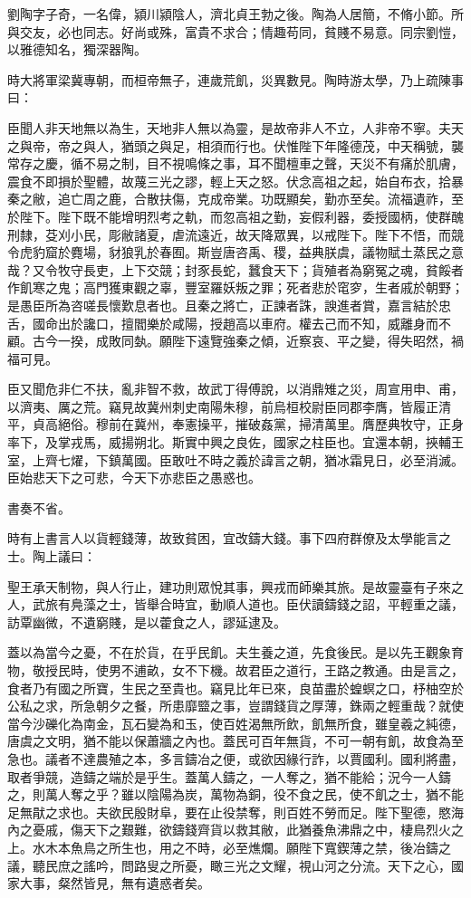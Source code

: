 \begin{pinyinscope}
劉陶字子奇，一名偉，潁川潁陰人，濟北貞王勃之後。陶為人居簡，不脩小節。所與交友，必也同志。好尚或殊，富貴不求合；情趣苟同，貧賤不易意。同宗劉愷，以雅德知名，獨深器陶。

時大將軍梁冀專朝，而桓帝無子，連歲荒飢，災異數見。陶時游太學，乃上疏陳事曰：

臣聞人非天地無以為生，天地非人無以為靈，是故帝非人不立，人非帝不寧。夫天之與帝，帝之與人，猶頭之與足，相須而行也。伏惟陛下年隆德茂，中天稱號，襲常存之慶，循不易之制，目不視鳴條之事，耳不聞檀車之聲，天災不有痛於肌膚，震食不即損於聖體，故蔑三光之謬，輕上天之怒。伏念高祖之起，始自布衣，拾暴秦之敝，追亡周之鹿，合散扶傷，克成帝業。功既顯矣，勤亦至矣。流福遺祚，至於陛下。陛下既不能增明烈考之軌，而忽高祖之勤，妄假利器，委授國柄，使群醜刑隸，芟刈小民，彫敝諸夏，虐流遠近，故天降眾異，以戒陛下。陛下不悟，而競令虎豹窟於麑場，豺狼乳於春囿。斯豈唐咨禹、稷，益典朕虞，議物賦土蒸民之意哉？又令牧守長吏，上下交競；封豕長蛇，蠶食天下；貨殖者為窮冤之魂，貧餒者作飢寒之鬼；高門獲東觀之辜，豐室羅妖叛之罪；死者悲於窀穸，生者戚於朝野；是愚臣所為咨嗟長懷歎息者也。且秦之將亡，正諫者誅，諛進者賞，嘉言結於忠舌，國命出於讒口，擅閻樂於咸陽，授趙高以車府。權去己而不知，威離身而不顧。古今一揆，成敗同埶。願陛下遠覽強秦之傾，近察哀、平之變，得失昭然，禍福可見。

臣又聞危非仁不扶，亂非智不救，故武丁得傅說，以消鼎雉之災，周宣用申、甫，以濟夷、厲之荒。竊見故冀州刺史南陽朱穆，前烏桓校尉臣同郡李膺，皆履正清平，貞高絕俗。穆前在冀州，奉憲操平，摧破姦黨，掃清萬里。膺歷典牧守，正身率下，及掌戎馬，威揚朔北。斯實中興之良佐，國家之柱臣也。宜還本朝，挾輔王室，上齊七燿，下鎮萬國。臣敢吐不時之義於諱言之朝，猶冰霜見日，必至消滅。臣始悲天下之可悲，今天下亦悲臣之愚惑也。

書奏不省。

時有上書言人以貨輕錢薄，故致貧困，宜改鑄大錢。事下四府群僚及太學能言之士。陶上議曰：

聖王承天制物，與人行止，建功則眾悅其事，興戎而師樂其旅。是故靈臺有子來之人，武旅有鳧藻之士，皆舉合時宜，動順人道也。臣伏讀鑄錢之詔，平輕重之議，訪覃幽微，不遺窮賤，是以藿食之人，謬延逮及。

蓋以為當今之憂，不在於貨，在乎民飢。夫生養之道，先食後民。是以先王觀象育物，敬授民時，使男不逋畝，女不下機。故君臣之道行，王路之教通。由是言之，食者乃有國之所寶，生民之至貴也。竊見比年已來，良苗盡於蝗螟之口，杼柚空於公私之求，所急朝夕之餐，所患靡盬之事，豈謂錢貨之厚薄，銖兩之輕重哉？就使當今沙礫化為南金，瓦石變為和玉，使百姓渴無所飲，飢無所食，雖皇羲之純德，唐虞之文明，猶不能以保蕭牆之內也。蓋民可百年無貨，不可一朝有飢，故食為至急也。議者不達農殖之本，多言鑄冶之便，或欲因緣行詐，以賈國利。國利將盡，取者爭競，造鑄之端於是乎生。蓋萬人鑄之，一人奪之，猶不能給；況今一人鑄之，則萬人奪之乎？雖以陰陽為炭，萬物為銅，役不食之民，使不飢之士，猶不能足無猒之求也。夫欲民殷財阜，要在止役禁奪，則百姓不勞而足。陛下聖德，愍海內之憂戚，傷天下之艱難，欲鑄錢齊貨以救其敝，此猶養魚沸鼎之中，棲鳥烈火之上。水木本魚鳥之所生也，用之不時，必至燋爛。願陛下寬鍥薄之禁，後冶鑄之議，聽民庶之謠吟，問路叟之所憂，瞰三光之文耀，視山河之分流。天下之心，國家大事，粲然皆見，無有遺惑者矣。


\end{pinyinscope}
